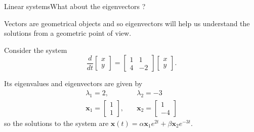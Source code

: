 \documentclass[usenames,dvipsnames,svgnames,10pt,aspectratio=169]{beamer}
\begin{document}
\begin{frame}[t, c]{Linear systems}{What about the eigenvectors ?}
  \begin{minipage}{.58\textwidth}
    Vectors are geometrical objects and so eigenvectors will help us understand the solutions from a geometric point of view.

    \bigskip

    Consider the system
    \[
    \dfrac{d}{dt} \begin{bmatrix} x \\ y \end{bmatrix}
    =
    \begin{bmatrix}
      1 & 1 \\
      4 & -2
    \end{bmatrix}
    \begin{bmatrix} x \\ y \end{bmatrix}.
    \]

    Its eigenvalues and eigenvectors are given by
    \[
    \begin{aligned}
      \lambda_1 = 2, \quad & \lambda_2 = -3 \\
      \bm{x}_1 = \begin{bmatrix} 1 \\ 1 \end{bmatrix}, \quad & \bm{x}_2 = \begin{bmatrix} 1 \\ -4 \end{bmatrix}
    \end{aligned}
    \]
    so the solutions to the system are $\bm{x}(t) = \alpha \bm{x}_1 e^{2t} + \beta \bm{x}_2 e^{-3t}$.
  \end{minipage}%
  \hfill
  \begin{minipage}{.38\textwidth}
    \centering
  \end{minipage}

  \vspace{1cm}
\end{frame}
\end{document}
